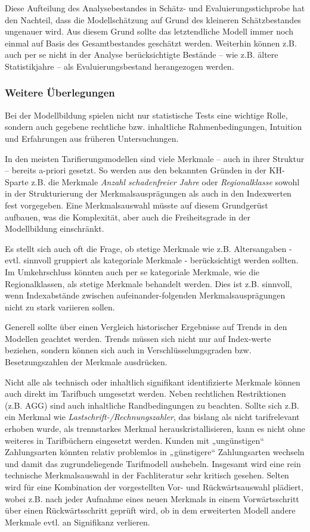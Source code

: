 Diese Aufteilung des Analysebestandes in Schätz- und Evaluierungsstichprobe hat den Nachteil, dass die Modellschätzung auf Grund des kleineren Schätzbestandes ungenauer wird. Aus diesem Grund sollte das letztendliche Modell immer noch einmal auf Basis des Gesamtbestandes geschätzt werden. Weiterhin können z.B. auch per se nicht in der Analyse berücksichtigte Bestände – wie z.B. ältere Statistikjahre – als Evaluierungsbestand herangezogen werden. 

\subsubsection{Weitere Überlegungen}

Bei der Modellbildung spielen nicht nur statistische Tests eine wichtige Rolle, sondern auch gegebene rechtliche bzw. inhaltliche Rahmenbedingungen, Intuition und Erfahrungen aus früheren Untersuchungen. 

In den meisten Tarifierungsmodellen sind viele Merkmale – auch in ihrer Struktur – bereits a-priori gesetzt. So werden aus den bekannten Gründen in der KH-Sparte z.B. die Merkmale \textit{Anzahl schadenfreier Jahre} oder  \textit{Regionalklasse} sowohl in der Strukturierung der Merkmalsausprägungen als auch in den Indexwerten fest vorgegeben. Eine Merkmalsauswahl müsste auf diesem Grundgerüst aufbauen, was die Komplexität, aber auch die Freiheitsgrade in der Modellbildung einschränkt.

Es stellt sich auch oft die Frage, ob stetige Merkmale wie z.B. Altersangaben - evtl. sinnvoll gruppiert als kategoriale Merkmale - berücksichtigt werden sollten. Im Umkehrschluss könnten auch per se kategoriale Merkmale, wie die Regionalklassen, als stetige Merkmale behandelt werden. Dies ist z.B. sinnvoll, wenn Indexabstände zwischen aufeinander-folgenden Merkmalsausprägungen nicht zu stark variieren sollen.

Generell sollte über einen Vergleich historischer Ergebnisse auf Trends in den Modellen geachtet werden. Trends müssen sich nicht nur auf Index-werte beziehen, sondern können sich auch in Verschlüsselungsgraden bzw. Besetzungszahlen der Merkmale ausdrücken.

Nicht alle als technisch oder inhaltlich signifikant identifizierte Merkmale können auch direkt im Tarifbuch umgesetzt werden. Neben rechtlichen Restriktionen (z.B. AGG) sind auch inhaltliche Randbedingungen zu beachten. Sollte sich z.B. ein Merkmal wie  \textit{Lastschrift-/Rechnungszahler}, das bislang als nicht tarifrelevant erhoben wurde, als trennstarkes Merkmal herauskristallisieren, kann es  nicht ohne weiteres in Tarifbüchern eingesetzt werden. Kunden mit „ungünstigen“ Zahlungsarten könnten relativ problemlos in „günstigere“ Zahlungsarten wechseln und damit das zugrundeliegende Tarifmodell aushebeln. Insgesamt wird eine rein technische Merkmalsauswahl in der Fachliteratur sehr kritisch gesehen. Selten wird für eine Kombination der vorgestellten Vor- und Rückwärtsauswahl plädiert, wobei z.B. nach jeder Aufnahme eines neuen Merkmals in einem Vorwärtsschritt über einen Rückwärtsschritt geprüft wird, ob in dem erweiterten Modell andere Merkmale evtl. an Signifikanz verlieren. 

